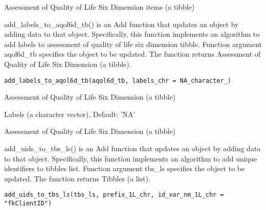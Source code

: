 \documentclass[a4paper]{book}
\begin{document}
%
\begin{Value}
Assessment of Quality of Life Six Dimension items (a tibble)
\end{Value}
%
\begin{Description}\relax
add\_labels\_to\_aqol6d\_tb() is an Add function that updates an object by adding data to that object. Specifically, this function implements an algorithm to add labels to assessment of quality of life six dimension tibble. Function argument aqol6d\_tb specifies the object to be updated. The function returns Assessment of Quality of Life Six Dimension (a tibble).
\end{Description}
%
\begin{Usage}
\begin{verbatim}
add_labels_to_aqol6d_tb(aqol6d_tb, labels_chr = NA_character_)
\end{verbatim}
\end{Usage}
%
\begin{Arguments}
\begin{ldescription}
\item[\code{aqol6d\_tb}] Assessment of Quality of Life Six Dimension (a tibble)

\item[\code{labels\_chr}] Labels (a character vector), Default: 'NA'
\end{ldescription}
\end{Arguments}
%
\begin{Value}
Assessment of Quality of Life Six Dimension (a tibble)
\end{Value}
%
\begin{Description}\relax
add\_uids\_to\_tbs\_ls() is an Add function that updates an object by adding data to that object. Specifically, this function implements an algorithm to add unique identifiers to tibbles list. Function argument tbs\_ls specifies the object to be updated. The function returns Tibbles (a list).
\end{Description}
%
\begin{Usage}
\begin{verbatim}
add_uids_to_tbs_ls(tbs_ls, prefix_1L_chr, id_var_nm_1L_chr = "fkClientID")
\end{verbatim}
\end{Usage}
\end{document}
